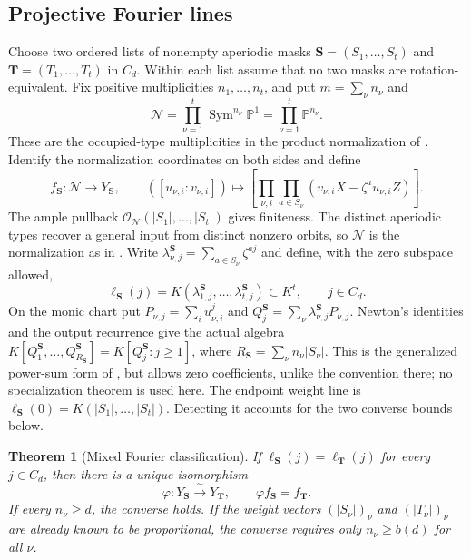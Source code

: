 \documentclass[10pt,fleqn]{article}
\numberwithin{equation}{section}
\newtheorem{theorem}{Theorem}[section]
\newcommand{\PP}{\mathbb P}
\newcommand{\sym}{\operatorname{Sym}}
\begin{document}
\subsection{Projective Fourier lines}

Choose two ordered lists of nonempty aperiodic masks
$\boldsymbol S=(S_1,\ldots,S_t)$ and
$\boldsymbol T=(T_1,\ldots,T_t)$ in $C_d$.  Within each list assume that
no two masks are rotation-equivalent.  Fix positive multiplicities
$n_1,\ldots,n_t$, and put $m=\sum_\nu n_\nu$ and
\[
 \mathcal N=\prod_{\nu=1}^t\sym^{n_\nu}\PP^1
           =\prod_{\nu=1}^t\PP^{n_\nu}.
\]
These are the occupied-type multiplicities in the product normalization of
\cite[Theorem~5.4]{LiProfileGeometry}.  Identify the normalization
coordinates on both sides and define
\begin{equation}\label{v6:spec:mixed-map}
 f_{\boldsymbol S}:\mathcal N\longrightarrow Y_{\boldsymbol S},
 \qquad
 ([u_{\nu,i}:v_{\nu,i}])\longmapsto
 \left[\prod_{\nu,i}\prod_{a\in S_\nu}
 (v_{\nu,i}X-\zeta^a u_{\nu,i}Z)\right].
\end{equation}
The ample pullback $\mathcal O_{\mathcal N}(|S_1|,\ldots,|S_t|)$
gives finiteness.  The distinct aperiodic types recover a general
input from distinct nonzero orbits, so $\mathcal N$ is the normalization
as in \cite[Theorem~5.4]{LiProfileGeometry}.
Write $\lambda^{\boldsymbol S}_{\nu,j}=\sum_{a\in S_\nu}\zeta^{aj}$
and define, with the zero subspace allowed,
\begin{equation}\label{v6:spec:fourier-lines}
 \ell_{\boldsymbol S}(j)
 =K(\lambda^{\boldsymbol S}_{1,j},\ldots,
       \lambda^{\boldsymbol S}_{t,j})\subset K^t,
 \qquad j\in C_d.
\end{equation}
On the monic chart put $P_{\nu,j}=\sum_i u_{\nu,i}^j$ and
$Q_j^{\boldsymbol S}=\sum_\nu\lambda^{\boldsymbol S}_{\nu,j}P_{\nu,j}$.
Newton's identities and the output recurrence give the actual algebra
$K[Q_1^{\boldsymbol S},\ldots,Q_{R_{\boldsymbol S}}^{\boldsymbol S}]
=K[Q_j^{\boldsymbol S}:j\ge1]$, where
$R_{\boldsymbol S}=\sum_\nu n_\nu|S_\nu|$.
This is the generalized power-sum form of
\cite[Section~1]{EtingofRains}, but allows zero coefficients,
unlike the convention there; no specialization theorem is used here.
The endpoint weight line is
$\ell_{\boldsymbol S}(0)=K(|S_1|,\ldots,|S_t|)$.
Detecting it accounts for the two converse bounds below.

\begin{theorem}[Mixed Fourier classification]
\label{v6:spec:mixed-classification}
If $\ell_{\boldsymbol S}(j)=\ell_{\boldsymbol T}(j)$ for every
$j\in C_d$, then there is a unique isomorphism
\[
 \varphi:Y_{\boldsymbol S}\xrightarrow{\ \sim\ }Y_{\boldsymbol T},
 \qquad \varphi f_{\boldsymbol S}=f_{\boldsymbol T}.
\]
If every $n_\nu\ge d$, the converse holds.  If the weight vectors
$(|S_\nu|)_\nu$ and $(|T_\nu|)_\nu$ are already known to be
proportional, the converse requires only $n_\nu\ge b(d)$ for all $\nu$.
\end{theorem}
\end{document}

